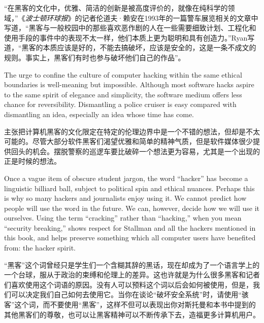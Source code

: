 \ifdefined\chs
“在黑客的文化中，优雅、简洁的创新是被高度评价的，就像在纯科学的领域，”《\textit{波士顿环球报}》的记者伦道夫·赖安在1993年的一篇警车展览相关的文章中写道，“黑客与一般校园中的那些喜欢恶作剧的人在一些需要细致计划、工程化和使用手段的事件中的表现不太一样，他们本质上更为聪明和具有创造力。”Ryan写道，“黑客的本质应该是好的，不能去搞破坏，应该是安全的，这是一条不成文的规则。事实上，黑客们有时也参与破坏他们自己的作品”。
\fi

\ifdefined\eng
The urge to confine the culture of computer hacking within the same ethical boundaries is well-meaning but impossible. Although most software hacks aspire to the same spirit of elegance and simplicity, the software medium offers less chance for reversibility. Dismantling a police cruiser is easy compared with dismantling an idea, especially an idea whose time has come.
\fi

\ifdefined\chs
主张把计算机黑客的文化限定在特定的伦理边界中是一个不错的想法，但却是不太可能的。尽管大部分软件黑客们渴望优雅和简单的精神气质，但是软件媒体很少提供回头的机会。摆脱警察的巡逻车要比破碎一个想法更为容易，尤其是一个出现的正是时候的想法。
\fi

\ifdefined\eng
Once a vague item of obscure student jargon, the word ``hacker'' has become a linguistic billiard ball, subject to political spin and ethical nuances. Perhaps this is why so many hackers and journalists enjoy using it.  We cannot predict how people will use the word in the future.  We can, however, decide how we will use it ourselves.  Using the term ``cracking'' rather than ``hacking,'' when you mean ``security breaking,'' shows respect for Stallman and all the hackers mentioned in this book, and helps preserve something which all computer users have benefited from: the hacker spirit.
\fi

\ifdefined\chs
“黑客”这个词曾经只是学生们一个含糊其辞的黑话，现在却成为了一个语言学上的一个台球，服从于政治的束缚和伦理上的差异。这也许就是为什么很多黑客和记者们喜欢使用这个词语的原因。没有人可以预料这个词以后会如何被使用，但是，我们可以决定我们自己如何去使用它。当你在谈论“破坏安全系统”时，请使用“骇客”这个词，而不要使用“黑客”，这样不但可以表现出你对斯托曼和本书中提到的其他黑客们的尊敬，也可以让黑客精神可以不断传承下去，造福更多计算机用户。
\fi
